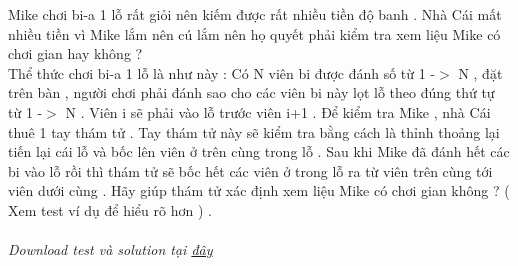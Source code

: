 Mike chơi bi-a 1 lỗ rất giỏi nên kiếm được rất nhiều tiền độ banh . Nhà Cái mất nhiều tiền vì Mike lắm nên cú lắm nên họ quyết phải kiểm tra xem liệu Mike có chơi gian hay không ?   
\\   Thể thức chơi bi-a 1 lỗ là như này : Có N viên bi được đánh số từ 1 -$>$ N , đặt trên bàn , người chơi phải đánh sao cho các viên bi này lọt lỗ theo đúng thứ tự từ 1 -$>$ N . Viên i sẽ phải vào lỗ trước viên i+1 . Để kiểm tra Mike , nhà Cái thuê 1 tay thám tử . Tay thám tử này sẽ kiểm tra bằng cách là thỉnh thoảng lại tiến lại cái lỗ và bốc lên viên ở trên cùng trong lỗ . Sau khi Mike đã đánh hết các bi vào lỗ rồi thì thám tử sẽ bốc hết các viên ở trong lỗ ra từ viên trên cùng tới viên dưới cùng . Hãy giúp thám tử xác định xem liệu Mike có chơi gian không ? ( Xem test ví dụ để hiểu rõ hơn ) .   
\\
\\\textit{    Download test và solution tại    \href{https://vn.spoj.pl/content/cheat.zip}{     đây    }}

\